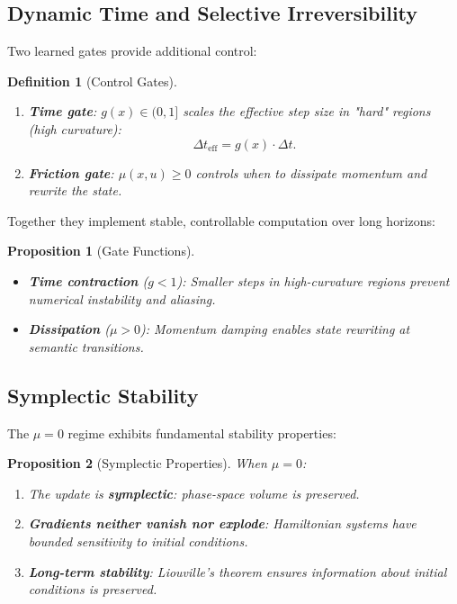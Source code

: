 \documentclass[12pt,letterpaper,twoside]{article}
\newtheorem{definition}{Definition}[section]
\newtheorem{prop}{Proposition}[section]
\begin{document}
\subsection{Dynamic Time and Selective Irreversibility}

Two learned gates provide additional control:

\begin{definition}[Control Gates]
\begin{enumerate}
\item \textbf{Time gate}: $g(x) \in (0, 1]$ scales the effective step size in "hard" regions (high curvature):
\[
\Delta t_{\text{eff}} = g(x) \cdot \Delta t.
\]

\item \textbf{Friction gate}: $\mu(x, u) \geq 0$ controls when to dissipate momentum and rewrite the state.
\end{enumerate}
\end{definition}

Together they implement stable, controllable computation over long horizons:

\begin{prop}[Gate Functions]
\begin{itemize}
\item \textbf{Time contraction} ($g < 1$): Smaller steps in high-curvature regions prevent numerical instability and aliasing.
\item \textbf{Dissipation} ($\mu > 0$): Momentum damping enables state rewriting at semantic transitions.
\end{itemize}
\end{prop}

\subsection{Symplectic Stability}

The $\mu = 0$ regime exhibits fundamental stability properties:

\begin{prop}[Symplectic Properties]
When $\mu = 0$:
\begin{enumerate}
\item The update is \textbf{symplectic}: phase-space volume is preserved.
\item \textbf{Gradients neither vanish nor explode}: Hamiltonian systems have bounded sensitivity to initial conditions.
\item \textbf{Long-term stability}: Liouville's theorem ensures information about initial conditions is preserved.
\end{enumerate}
\end{prop}
\end{document}
